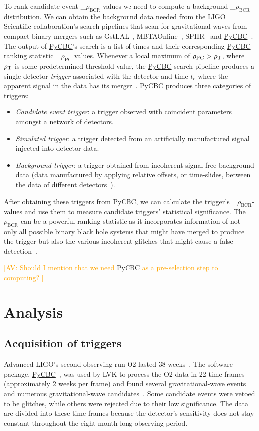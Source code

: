 \documentclass[%
 nofootinbib,
 amsmath,amssymb,
 aps,
 twocolumn,
 superscriptaddress
]{revtex4-2}
\newcommand{\gstlal}{{\sc GstLAL}\xspace}
\newcommand{\spiir}{{\sc SPIIR}\xspace}
\newcommand{\mbta}{{\sc MBTAOnline}\xspace}
\newcommand{\pycbc}{{\sc \href{https://pycbc.org/}{{PyCBC}}}\xspace}
\newcommand{\mathcmd}[1]{{\sc \relax\ifmmode#1\else $#1$\fi}\xspace}
\newcommand{\bcr}{\mathcmd{\rho_\text{BCR}}}
\newcommand{\pycbcstat}{\mathcmd{\rho_\text{PC}}}
\newcommand{\snr}{\mathcmd{\rho}}
\newcommand{\avi}[1]{\textcolor{orange}{[AV: #1]}}
\begin{document}
To rank candidate event \bcr-values we need to compute a background \bcr distribution. We can obtain the background data needed from the LIGO Scientific collaboration's search pipelines that scan for gravitational-waves from compact binary mergers such as \gstlal~\cite{sachdev2019gstlal}, \mbta~\cite{MBTA}, \spiir~\cite{spiir} and \pycbc~\cite{pycbc_og4}. The output of \pycbc's search is a list of times and their corresponding \pycbc ranking statistic \pycbcstat values. Whenever a local maximum of $\pycbcstat > \snr_\text{T}$, where $\snr_\text{T}$ is some predetermined threshold value, the \pycbc search pipeline produces a single-detector \textit{trigger} associated with the detector and time $t_c$ where the apparent signal in the data has its merger~\cite{pycbc_og6}. \pycbc produces three categories of triggers: 
\begin{itemize}
    \item \textit{Candidate event trigger}: a trigger observed with coincident parameters amongst a network of detectors. 
    \item \textit{Simulated trigger}: a trigger detected from an artificially manufactured signal injected into detector data.  
    \item \textit{Background trigger}: a trigger obtained from incoherent signal-free background data (data manufactured by applying relative offsets, or time-slides, between the data of different detectors~\cite{pycbc_og6}). 
\end{itemize}

After obtaining these triggers from \pycbc, we can calculate the trigger's \bcr-values and use them to measure candidate triggers' statistical significance. The \bcr can be a powerful ranking statistic as it incorporates information of not only all possible binary black hole systems that might have merged to produce the trigger but also the various incoherent glitches that might cause a false-detection~\cite{BCR1}. 

\avi{Should I mention that we need \pycbc  as a pre-selection step to computing? }

\section{Analysis}\label{sec:Analysis}

\subsection{Acquisition of triggers}
Advanced LIGO's second observing run O2 lasted $38$ weeks~\cite{GWOSC}. The software package, \pycbc~\cite{pycbc_code}, was used by LVK to process the O2 data in 22 time-frames (approximately 2 weeks per frame) and found several gravitational-wave events and numerous gravitational-wave candidates~\cite{pycbc_og0, pycbc_og1, pycbc_og2, pycbc_og3, pycbc_og4, pycbc_og5, pycbc_og6}. Some candidate events were vetoed to be glitches, while others were rejected due to their low significance. The data are divided into these time-frames because the detector's sensitivity does not stay constant throughout the eight-month-long observing period.
\end{document}
